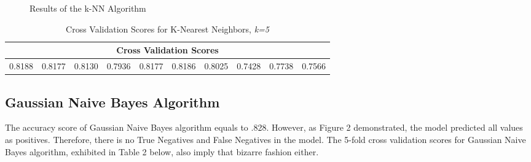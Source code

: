 \documentclass[a4paper]{article}
\begin{document}
\begin{figure}[htbp!]
    \centering
    \hfill
    \caption{Results of the k-NN Algorithm}
\end{figure}

\begin{table}[htbp!]
\centering
\begin{tabular}{ |c|c|c|c|c|c|c|c|c|c| } 
 \hline
 \multicolumn{10}{|c|}{\textbf{Cross Validation Scores}} \\
 \hline
 0.8188 & 0.8177 & 0.8130 & 0.7936 & 0.8177 & 0.8186 & 0.8025 & 0.7428 & 0.7738 & 0.7566 \\ 
 \hline
\end{tabular}
\caption{Cross Validation Scores for K-Nearest Neighbors, \textit{k=5}}
\end{table}

\subsection*{Gaussian Naive Bayes Algorithm}

    The accuracy score of Gaussian Naive Bayes algorithm equals to .828. However, as Figure 2 demonstrated, the model predicted all values as positives. Therefore, there is no True Negatives and False Negatives in the model. The 5-fold cross validation scores for Gaussian Naive Bayes algorithm, exhibited in Table 2 below, also imply that bizarre fashion either.
\end{document}
